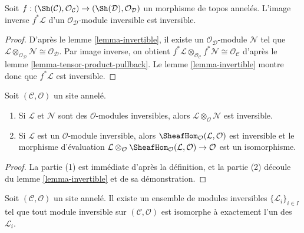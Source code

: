 \begin{lemma}

\label{lemma-pullback-invertible}

Soit $f : (\Sh(\mathcal{C}), \mathcal{O}_\mathcal{C}) \to
(\Sh(\mathcal{D}), \mathcal{O}_\mathcal{D})$ un morphisme de topos
annelés. L'image inverse $f^*\mathcal{L}$ d'un
$\mathcal{O}_\mathcal{D}$-module inversible est inversible.

\end{lemma}

\begin{proof}
D'après le lemme \ref{lemma-invertible}, il existe un
$\mathcal{O}_\mathcal{D}$-module $\mathcal{N}$ tel que
$\mathcal{L} \otimes_{\mathcal{O}_\mathcal{D}} \mathcal{N} \cong
\mathcal{O}_\mathcal{D}$. Par image inverse, on obtient
$f^*\mathcal{L} \otimes_{\mathcal{O}_\mathcal{C}} f^*\mathcal{N} \cong
\mathcal{O}_\mathcal{C}$ d'après le lemme
\ref{lemma-tensor-product-pullback}. Le lemme \ref{lemma-invertible} montre
donc que $f^*\mathcal{L}$ est inversible.
\end{proof}

\begin{lemma}

\label{lemma-constructions-invertible}
Soit $(\mathcal{C}, \mathcal{O})$ un site annelé.
\begin{enumerate}
\item Si $\mathcal{L}$ et $\mathcal{N}$ sont des $\mathcal{O}$-modules
inversibles, alors $\mathcal{L} \otimes_\mathcal{O} \mathcal{N}$ est
inversible.
\item Si $\mathcal{L}$ est un $\mathcal{O}$-module inversible, alors
$\SheafHom_\mathcal{O}(\mathcal{L}, \mathcal{O})$ est inversible et le
morphisme d'évaluation $\mathcal{L} \otimes_\mathcal{O}
\SheafHom_\mathcal{O}(\mathcal{L}, \mathcal{O}) \to \mathcal{O}$ est un isomorphisme.
\end{enumerate}

\end{lemma}

\begin{proof}

La partie (1) est immédiate d'après la définition, et la partie (2) découle
du lemme \ref{lemma-invertible} et de sa démonstration.

\end{proof}

\begin{lemma}

\label{lemma-pic-set}

Soit $(\mathcal{C}, \mathcal{O})$ un site annelé. Il existe un ensemble de
modules inversibles $\{\mathcal{L}_i\}_{i \in I}$ tel que tout module
inversible sur $(\mathcal{C}, \mathcal{O})$
est isomorphe à exactement l'un des $\mathcal{L}_i$.

\end{lemma}

